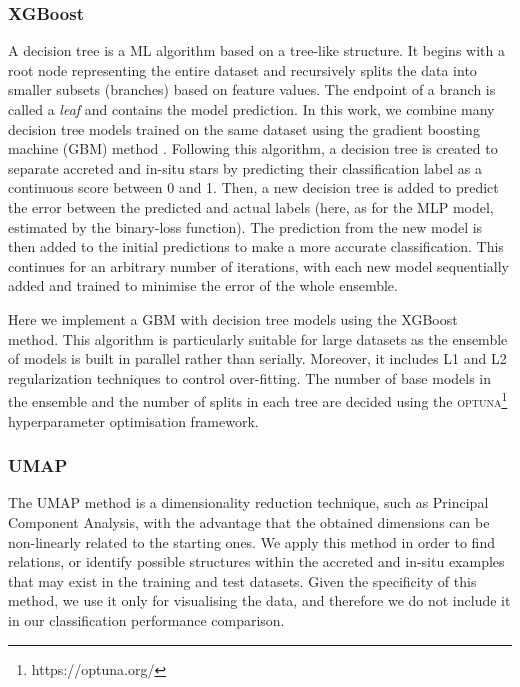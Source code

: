 \subsubsection{XGBoost}
\label{subsec:xgb}

A decision tree is a ML algorithm based on a tree-like structure. It begins with a root node representing the entire dataset and recursively splits the data into smaller subsets (branches) based on feature values. The endpoint of a branch is called a \textit{leaf} and contains the model prediction. In this work, we combine many decision tree models trained on the same dataset using the gradient boosting machine (GBM) method \citep{Friedman2001}. Following this algorithm, a decision tree is created to separate accreted and in-situ stars by predicting their classification label as a continuous score between 0 and 1. Then, a new decision tree is added to predict the error between the predicted and actual labels (here, as for the MLP model, estimated by the binary-loss function). The prediction from the new model is then added to the initial predictions to make a more accurate classification. This continues for an arbitrary number of iterations, with each new model sequentially added and trained to minimise the error of the whole ensemble.

Here we implement a GBM with decision tree models using the XGBoost \citep{Chen2016} method. This algorithm is particularly suitable for large datasets as the ensemble of models is built in parallel rather than serially. Moreover, it includes L1 and L2 regularization techniques to control over-fitting. The number of base models in the ensemble and the number of splits in each tree are decided using the \textsc{optuna}\footnote{https://optuna.org/} hyperparameter optimisation framework.

\subsubsection{UMAP}
\label{subsec:umap}

The UMAP method \citep{McInnes2018b} is a dimensionality reduction  technique, such as Principal Component Analysis, with the advantage that the obtained dimensions can be non-linearly related to the starting ones. We apply this method in order to find relations, or identify possible structures within the accreted and in-situ examples that may exist in the training and test datasets. Given the specificity of this method, we use it only for visualising the data, and therefore we do not include it in our classification performance comparison.

